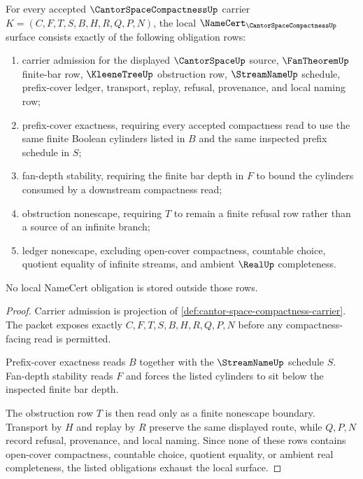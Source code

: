 \begin{theorem}
\label{thm:cantor-space-compactness-namecert-obligations}
For every accepted $\CantorSpaceCompactnessUp$ carrier $K=(C,F,T,S,B,H,R,Q,P,N)$, the local $\NameCert_{\CantorSpaceCompactnessUp}$ surface consists exactly of the following obligation rows:
\begin{enumerate}
\item carrier admission for the displayed $\CantorSpaceUp$ source, $\FanTheoremUp$ finite-bar row, $\KleeneTreeUp$ obstruction row, $\StreamNameUp$ schedule, prefix-cover ledger, transport, replay, refusal, provenance, and local naming row;
\item prefix-cover exactness, requiring every accepted compactness read to use the same finite Boolean cylinders listed in $B$ and the same inspected prefix schedule in $S$;
\item fan-depth stability, requiring the finite bar depth in $F$ to bound the cylinders consumed by a downstream compactness read;
\item obstruction nonescape, requiring $T$ to remain a finite refusal row rather than a source of an infinite branch;
\item ledger nonescape, excluding open-cover compactness, countable choice, quotient equality of infinite streams, and ambient $\RealUp$ completeness.
\end{enumerate}
No local NameCert obligation is stored outside those rows.
\end{theorem}
\begin{proof}
Carrier admission is projection of \autoref{def:cantor-space-compactness-carrier}. The packet exposes exactly $C,F,T,S,B,H,R,Q,P,N$ before any compactness-facing read is permitted.

Prefix-cover exactness reads $B$ together with the $\StreamNameUp$ schedule $S$. Fan-depth stability reads $F$ and forces the listed cylinders to sit below the inspected finite bar depth.

The obstruction row $T$ is then read only as a finite nonescape boundary. Transport by $H$ and replay by $R$ preserve the same displayed route, while $Q,P,N$ record refusal, provenance, and local naming. Since none of these rows contains open-cover compactness, countable choice, quotient equality, or ambient real completeness, the listed obligations exhaust the local surface.
\end{proof}

